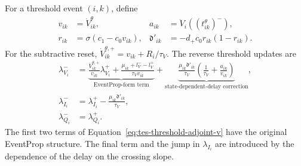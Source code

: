 For a threshold event $(i,k)$, define
\begin{align}
    v_{ik}&=\dot V^\theta_{ik},
    &a_{ik}&=\ddot V_i\!\left((t^\theta_{ik})^-\right),\\
    r_{ik}&=\sigma(c_1-c_0v_{ik}),
    &\mathfrak d'_{ik}&=-d_+c_0r_{ik}(1-r_{ik}).
    \label{eq:tes-threshold-auxiliary}
\end{align}
For the subtractive reset,
$\dot V_{ik}^{\theta,+}=v_{ik}+R_i/\tau_V$. The reverse threshold
updates are
\begin{align}
    \lambda_{V_i}^-
      &=\underbrace{
        \frac{\dot V_{ik}^{\theta,+}}{v_{ik}}\lambda_{V_i}^+
        +\frac{\mu_{ik}+l_V^- -l_V^+}{\tau_Vv_{ik}}
        }_{\text{EventProp-form term}}
        +\underbrace{
        \frac{\mu_{ik}\mathfrak d'_{ik}}{\tau_V}
        \left(\frac{1}{\tau_V}+\frac{a_{ik}}{v_{ik}}\right)
        }_{\text{state-dependent-delay correction}},
        \label{eq:tes-threshold-adjoint-v}\\
    \lambda_{I_i}^-
      &=\lambda_{I_i}^+
        -\frac{\mu_{ik}\mathfrak d'_{ik}}{\tau_V},
        \label{eq:tes-threshold-adjoint-i}\\
    \lambda_{Q_i}^-&=\lambda_{Q_i}^+.
        \label{eq:tes-threshold-adjoint-q}
\end{align}
The first two terms of Equation~\eqref{eq:tes-threshold-adjoint-v} have the
original EventProp structure. The final term and the jump in $\lambda_{I_i}$
are introduced by the dependence of the delay on the crossing slope.

